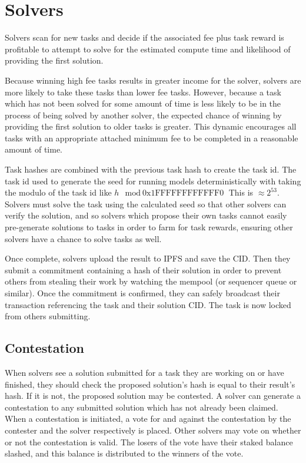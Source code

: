 \documentclass{article}
\begin{document}
\section{Solvers}

Solvers scan for new tasks and decide if the associated fee plus task reward is profitable to attempt to solve for the estimated compute time and likelihood of providing the first solution.

Because winning high fee tasks results in greater income for the solver, solvers are more likely to take these tasks than lower fee tasks. However, because a task which has not been solved for some amount of time is less likely to be in the process of being solved by another solver, the expected chance of winning by providing the first solution to older tasks is greater. This dynamic encourages all tasks with an appropriate attached minimum fee to be completed in a reasonable amount of time.

Task hashes are combined with the previous task hash to create the task id. The task id used to generate the seed for running models deterministically with taking the modulo of the task id like $ h \mod \text{0x1FFFFFFFFFFFF0} $ This is $\approx 2^{53}$. Solvers must solve the task using the calculated seed so that other solvers can verify the solution, and so solvers which propose their own tasks cannot easily pre-generate solutions to tasks in order to farm for task rewards, ensuring other solvers have a chance to solve tasks as well.

Once complete, solvers upload the result to IPFS and save the CID. Then they submit a commitment containing a hash of their solution in order to prevent others from stealing their work by watching the mempool (or sequencer queue or similar). Once the commitment is confirmed, they can safely broadcast their transaction referencing the task and their solution CID. The task is now locked from others submitting.

\subsection{Contestation} \label{contestation}


When solvers see a solution submitted for a task they are working on or have finished, they should check the proposed solution's hash is equal to their result's hash. If it is not, the proposed solution may be contested. A solver can generate a contestation to any submitted solution which has not already been claimed. When a contestation is initiated, a vote for and against the contestation by the contester and the solver respectively is placed. Other solvers may vote on whether or not the contestation is valid. The losers of the vote have their staked balance slashed, and this balance is distributed to the winners of the vote.
\end{document}
